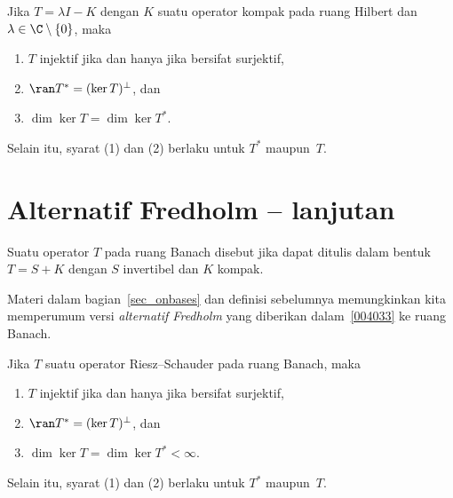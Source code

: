 \begin{prop}\label{004033} Jika $T = \lambda I - K$ dengan
$K$ suatu operator kompak pada ruang Hilbert dan $\lambda \in \C\setminus\{0\}$, maka
 \begin{enumerate}
  \item $T$ injektif jika dan hanya jika bersifat surjektif,
  \item $\ran T^* = (\ker T)^\perp$, dan
  \item $\dim\ker T = \dim \ker T^*$.
 \end{enumerate}
Selain itu, syarat (1) dan (2) berlaku untuk $T^*$ maupun~$T$.
\end{prop}


















\section{Alternatif Fredholm -- lanjutan}
\begin{defn}\label{004034} Suatu operator $T$ pada ruang Banach disebut
 jika dapat ditulis dalam bentuk $T = S + K$ dengan $S$
invertibel dan $K$ kompak.
\end{defn}

Materi dalam bagian~\ref{sec_onbases} dan definisi sebelumnya memungkinkan kita
memperumum versi \emph{alternatif Fredholm} yang diberikan dalam~\ref{004033} ke ruang
Banach.

\begin{prop}\label{0040343} Jika $T$ suatu operator Riesz--Schauder
pada ruang Banach, maka
 \begin{enumerate}
  \item $T$ injektif jika dan hanya jika bersifat surjektif,
  \item $\ran T^* = (\ker T)^\perp$, dan
  \item $\dim\ker T = \dim \ker T^* < \infty$.
 \end{enumerate}
Selain itu, syarat (1) dan (2) berlaku untuk $T^*$ maupun~$T$.
\end{prop}

